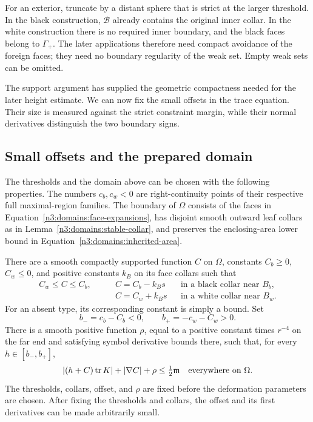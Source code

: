 For an exterior, truncate by a distant sphere that is strict at the
larger threshold.  In the black construction, $\mathcal B$ already
contains the original inner collar.  In the white construction there is
no required inner boundary, and the black faces belong to $\Gamma_+$.
The later applications therefore need compact avoidance of the foreign
faces; they need no boundary regularity of the weak set.  Empty weak sets
can be omitted.

The support argument has supplied the geometric compactness needed
for the later height estimate. We can now fix the small offsets in
the trace equation. Their size is measured against the strict
constraint margin, while their normal derivatives distinguish the
two boundary signs.

\subsection{Small offsets and the prepared domain}

\begin{proposition}\label{n3:domains:prepared-domain}
The thresholds and the domain above can be chosen with the following
properties.  The numbers $c_b,c_w<0$ are right-continuity points of
their respective full maximal-region families.  The boundary of
$\Omega$ consists of the faces in
Equation~\eqref{n3:domains:face-expansions}, has disjoint smooth
outward leaf collars as in
Lemma~\ref{n3:domains:stable-collar}, and preserves the enclosing-area
lower bound in Equation~\eqref{n3:domains:inherited-area}.

There are a smooth compactly supported function $C$ on $\Omega$,
constants $C_b\geq0$, $C_w\leq0$, and positive constants $k_B$
on its face collars such that
\begin{equation}\label{n3:domains:offset-collars}
 \begin{aligned}
  C_w\leq C\leq C_b,&\qquad
  C=C_b-k_Bs&&\text{in a black collar near }B_b,\\
  &\qquad C=C_w+k_Bs&&\text{in a white collar near }B_w.
 \end{aligned}
\end{equation}
For an absent type, its corresponding constant is simply a bound.
Set
\begin{equation}\label{n3:domains:assigned-heights}
 b_-=c_b-C_b<0,
 \qquad b_+=-c_w-C_w>0.
\end{equation}
There is a smooth positive function $\rho$, equal to a positive
constant times $r^{-4}$ on the far end and satisfying symbol
derivative bounds there, such that, for every $h\in[b_-,b_+]$,
\begin{equation}\label{n3:domains:offset-smallness}
 |(h+C)\operatorname{tr} K|+|\nabla C|+\rho
      \leq\tfrac12\mathfrak m
 \quad\hbox{everywhere on }\Omega.
\end{equation}
The thresholds, collars, offset, and $\rho$ are fixed before the
deformation parameters are chosen.  After fixing the thresholds and
collars, the offset and its first derivatives can be made arbitrarily
small.
\end{proposition}

